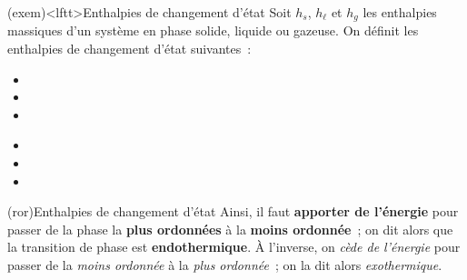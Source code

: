 \documentclass[../../main/main.tex]{subfiles}
\begin{document}
\begin{tcb*}(exem)<lftt>{Enthalpies de changement d'état}
	Soit $h_s$, $h_{\ell}$ et $h_g$ les enthalpies massiques d'un système en phase
	solide, liquide ou gazeuse. On définit les enthalpies de changement d'état
	suivantes~:
	\smallbreak
	\begin{isd}
		\begin{itemize}
			\item
			\item
			\item
		\end{itemize}
		\tcblower
		\begin{itemize}
			\item
			\item
			\item
		\end{itemize}
	\end{isd}
	\vspace{-25pt}
\end{tcb*}

\begin{tcb*}(ror){Enthalpies de changement d'état}
	Ainsi, il faut \textbf{apporter de l'énergie} pour passer de la phase la
	\textbf{plus ordonnées} à la \textbf{moins ordonnée}~; on dit alors que la
	transition de phase est \textbf{endothermique}. À l'inverse, on
	\textit{cède de l'énergie} pour passer de la \textit{moins ordonnée} à la
	\textit{plus ordonnée}~; on la dit alors \textit{exothermique}.
\end{tcb*}
\end{document}
